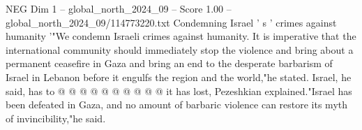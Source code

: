 \begin{textsample}{NEG Dim 1 – global\_north\_2024\_09 – Score 1.00 – global\_north\_2024\_09/114773220.txt}
Condemning Israel ' s ' crimes against humanity '"We condemn Israeli crimes against humanity.
It is imperative that the international community should immediately stop the violence and bring about a permanent ceasefire in Gaza and bring an end to the desperate barbarism of Israel in Lebanon before it engulfs the region and the world,"he stated.
Israel, he said, has to @ @ @ @ @ @ @ @ @ @ it has lost, Pezeshkian explained."Israel has been defeated in Gaza, and no amount of barbaric violence can restore its myth of invincibility,"he said.

\end{textsample}
